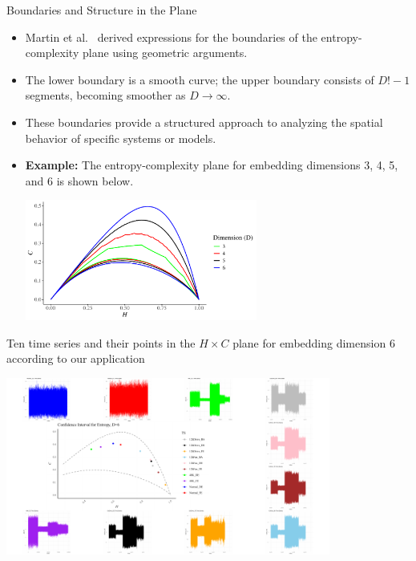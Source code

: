 \documentclass{beamer}
\begin{document}
	 


\begin{frame}{Boundaries and Structure in the Plane}
	\begin{itemize}
		\item Martin et al.~\cite{Martin2006} derived expressions for the boundaries of the entropy-complexity plane using geometric arguments.
		\item The \alert{lower boundary} is a smooth curve; the \alert{upper boundary} consists of $D!-1$ segments, becoming smoother as $D \to \infty$.
		\item These boundaries provide a structured approach to analyzing the spatial behavior of specific systems or models.
		\item \textbf{Example:} The entropy-complexity plane for embedding dimensions 3, 4, 5, and 6 is shown below.
		\begin{center}
			\includegraphics[width=0.6\textwidth]{complexity plane}
		\end{center}
	\end{itemize}
\end{frame}

\begin{frame}{Ten time series and their points in the $H \times C$ plane for embedding dimension 6 according to our application}
	\begin{center}
		\includegraphics[width=0.8\textwidth]{combined plot}
	\end{center}
	
\end{frame}
\end{document}
